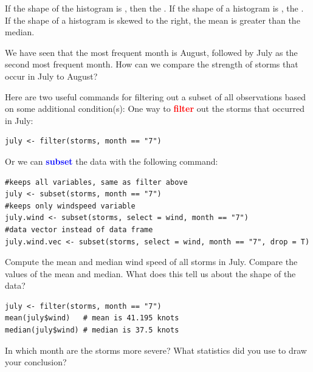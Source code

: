 \bi
\ii If the shape of the histogram is \textbf{}, then the \textbf{}.
\ii If the shape of a histogram is \textbf{}, the \textbf{}.
\ii If the shape of a histogram is \alert{skewed to the right}, the \alert{mean is greater than the median}.
\ei
\ebox


We have seen that the most frequent month is August, followed by July as the second most frequent month. How can we compare the strength of storms that occur in July to August?

\bbox
Here are two useful commands for filtering out a subset of all observations based on some additional condition(s):
\bi
\ii One way to  \textbf{\textcolor{red}{filter}} out the storms that occurred in July:

\begin{lstlisting}
july <- filter(storms, month == "7")
\end{lstlisting}


\ii Or we can \textbf{\textcolor{blue}{subset}} the data with the following command:

\begin{lstlisting}
#keeps all variables, same as filter above
july <- subset(storms, month == "7")
#keeps only windspeed variable
july.wind <- subset(storms, select = wind, month == "7")
#data vector instead of data frame
july.wind.vec <- subset(storms, select = wind, month == "7", drop = T) 
\end{lstlisting}

\ei

\ebox

\bb[resume]
\ii Compute the mean and median wind speed of all storms in July. Compare the values of the mean and median. What does this tell us about the shape of the data?

\begin{lstlisting}
july <- filter(storms, month == "7")
mean(july$wind)   # mean is 41.195 knots
median(july$wind) # median is 37.5 knots
\end{lstlisting}


\clearpage


\ii In which month are the storms more severe? What statistics did you use to draw your conclusion?

